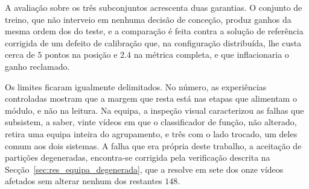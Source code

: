 A avaliação sobre os três subconjuntos acrescenta duas garantias. O conjunto de treino, que não
interveio em nenhuma decisão de conceção, produz ganhos da mesma ordem dos do teste, e a
comparação é feita contra a solução de referência corrigida de um defeito de calibração que, na
configuração distribuída, lhe custa cerca de $5$ pontos na posição e $2.4$
na métrica completa, e que inflacionaria o ganho reclamado.

Os limites ficaram igualmente delimitados. No número, as experiências controladas mostram que a
margem que resta está nas etapas que alimentam o módulo, e não na leitura. Na equipa, a inspeção
visual caracterizou as falhas que subsistem, a saber, vinte vídeos em que o classificador de função, não
alterado, retira uma equipa inteira do agrupamento, e três com o lado trocado, um deles comum aos
dois sistemas. A falha que era própria deste trabalho, a aceitação de partições degeneradas,
encontra-se corrigida pela verificação descrita na Secção~\ref{sec:res_equipa_degenerada}, que a
resolve em sete dos onze vídeos afetados sem alterar nenhum dos restantes $148$.
